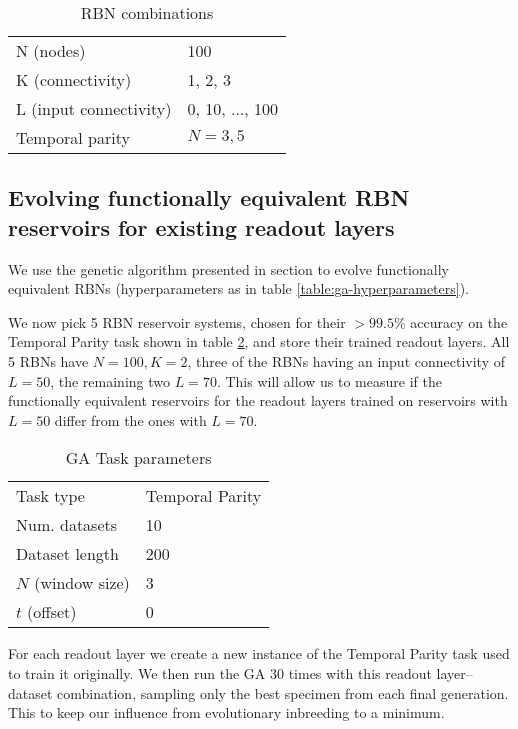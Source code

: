 \begin{table}[h]
  \centering
  \caption{RBN combinations}
  \label{table:rbn-combinations}
  \begin{tabular}{ll}
    N (nodes)              & 100             \\
    K (connectivity)       & 1, 2, 3         \\
    L (input connectivity) & 0, 10, ..., 100 \\
    Temporal parity        & $N=3,5$ \\
  \end{tabular}
\end{table}

\subsection{Evolving functionally equivalent RBN reservoirs for existing readout layers}

We use the genetic algorithm presented in section \label{section:method:evolving-rbns} to evolve functionally equivalent RBNs (hyperparameters as in table \ref{table:ga-hyperparameters}).

We now pick 5 RBN reservoir systems,
chosen for their $> 99.5\%$ accuracy on the Temporal Parity task shown in table
\ref{table:ga-task-parameters},
and store their trained readout layers.
All 5 RBNs have $N=100, K=2$, three of the RBNs having an input connectivity of $L=50$,
the remaining two $L=70$.
This will allow us to measure if the functionally equivalent reservoirs for the readout layers trained on reservoirs with $L=50$ differ from the ones with $L=70$.

\begin{table}[h]
  \centering
  \caption{GA Task parameters}
  \label{table:ga-task-parameters}
  \begin{tabular}{ll}
    Task type         & Temporal Parity \\
    Num. datasets     & 10               \\
    Dataset length    & 200             \\
    $N$ (window size) & 3               \\
    $t$ (offset)      & 0               \\
  \end{tabular}
\end{table}

For each readout layer we create a new instance of the Temporal Parity task used to train it originally.
We then run the GA 30 times with this readout layer–dataset combination,
sampling only the best specimen from each final generation.
This to keep our influence from evolutionary inbreeding to a minimum.
